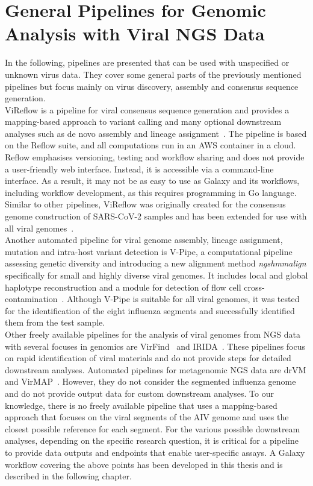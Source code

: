 \section{General Pipelines for Genomic Analysis with Viral NGS Data}
In the following, pipelines are presented that can be used with unspecified or unknown virus data. They cover some general parts of the previously mentioned pipelines but focus mainly on virus discovery, assembly and consensus sequence generation. \\
ViReflow is a pipeline for viral consensus sequence generation and provides a mapping-based approach to variant calling and many optional downstream analyses such as de novo assembly and lineage assignment~\cite{moshiri2022vireflow}. The pipeline is based on the Reflow suite, and all computations run in an \ac{AWS} container in a cloud. Reflow emphasises versioning, testing and workflow sharing and does not provide a user-friendly web interface. Instead, it is accessible via a command-line interface. As a result, it may not be as easy to use as Galaxy and its workflows, including workflow development, as this requires programming in Go language. Similar to other pipelines, ViReflow was originally created for the consensus genome construction of \ac{SARS-CoV-2} samples and has been extended for use with all viral genomes~\cite{moshiri2022vireflow}. \\
Another automated pipeline for viral genome assembly, lineage assignment, mutation and intra-host variant detection is V-Pipe, a computational pipeline assessing genetic diversity and introducing a new alignment method \textit{ngshmmalign} specifically for small and highly diverse viral genomes. It includes local and global haplotype reconstruction and a module for detection of flow cell cross-contamination~\cite{posada2021v}. Although V-Pipe is suitable for all viral genomes, it was tested for the identification of the eight influenza segments and successfully identified them from the test sample. \\
Other freely available pipelines for the analysis of viral genomes from \ac{NGS} data with several focuses in genomics are VirFind~\cite{ho2014development} and \ac{IRIDA}~\cite{matthews2018integrated}. These pipelines focus on rapid identification of viral materials and do not provide steps for detailed downstream analyses. Automated pipelines for metagenomic \ac{NGS} data are \ac{drVM} and VirMAP~\cite{lin2017drvm, ajami2018maximal}. However, they do not consider the segmented influenza genome and do not provide output data for custom downstream analyses. To our knowledge, there is no freely available pipeline that uses a mapping-based approach that focuses on the viral segments of the \ac{AIV} genome and uses the closest possible reference for each segment. For the various possible downstream analyses, depending on the specific research question, it is critical for a pipeline to provide data outputs and endpoints that enable user-specific assays.  A Galaxy workflow covering the above points has been developed in this thesis and is described in the following chapter.
